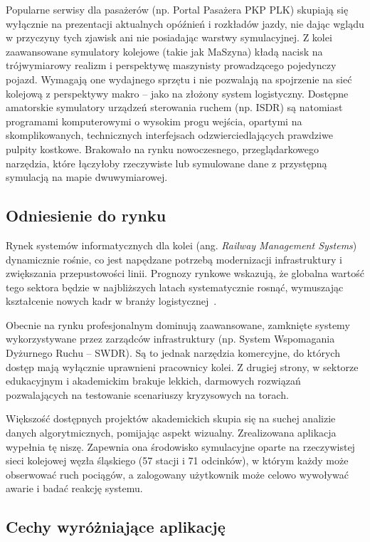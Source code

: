 \documentclass[twoside]{projektInzynierskiMS1z}
\begin{document}
Popularne serwisy dla pasażerów (np. Portal Pasażera PKP PLK) skupiają się wyłącznie
na prezentacji aktualnych opóźnień i rozkładów jazdy, nie dając wglądu w przyczyny
tych zjawisk ani nie posiadając warstwy symulacyjnej. Z kolei zaawansowane symulatory
kolejowe (takie jak MaSzyna) kładą nacisk na trójwymiarowy realizm i perspektywę
maszynisty prowadzącego pojedynczy pojazd. Wymagają one wydajnego sprzętu i nie
pozwalają na spojrzenie na sieć kolejową z perspektywy makro -- jako na złożony
system logistyczny. Dostępne amatorskie symulatory urządzeń sterowania ruchem
(np. ISDR) są natomiast programami komputerowymi o wysokim progu wejścia, opartymi
na skomplikowanych, technicznych interfejsach odzwierciedlających prawdziwe pulpity
kostkowe. Brakowało na rynku nowoczesnego, przeglądarkowego narzędzia, które
łączyłoby rzeczywiste lub symulowane dane z przystępną symulacją na mapie
dwuwymiarowej.

\subsection{Odniesienie do rynku}

Rynek systemów informatycznych dla kolei (ang. \emph{Railway Management Systems})
dynamicznie rośnie, co jest napędzane potrzebą modernizacji infrastruktury
i zwiększania przepustowości linii. Prognozy rynkowe wskazują, że globalna wartość
tego sektora będzie w najbliższych latach systematycznie rosnąć, wymuszając
kształcenie nowych kadr w branży logistycznej~\cite{railwaymarket}.

Obecnie na rynku profesjonalnym dominują zaawansowane, zamknięte systemy
wykorzystywane przez zarządców infrastruktury (np. System Wspomagania Dyżurnego
Ruchu -- SWDR). Są to jednak narzędzia komercyjne, do których dostęp mają wyłącznie
uprawnieni pracownicy kolei. Z drugiej strony, w sektorze edukacyjnym i akademickim
brakuje lekkich, darmowych rozwiązań pozwalających na testowanie scenariuszy
kryzysowych na torach.

Większość dostępnych projektów akademickich skupia się na suchej analizie danych
algorytmicznych, pomijając aspekt wizualny. Zrealizowana aplikacja wypełnia tę niszę.
   Zapewnia ona środowisko symulacyjne oparte na rzeczywistej sieci kolejowej
   węzła śląskiego (57 stacji i 71 odcinków), w którym każdy może obserwować ruch
   pociągów, a zalogowany użytkownik może celowo wywoływać awarie i badać reakcję
   systemu.

\subsection{Cechy wyróżniające aplikację}
\end{document}
